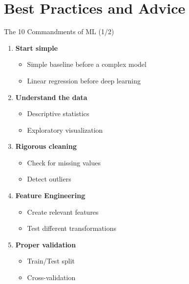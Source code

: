 \documentclass[12pt,aspectratio=169]{beamer}
\begin{document}
\section{Best Practices and Advice}

\begin{frame}{The 10 Commandments of ML (1/2)}
\begin{enumerate}
\item \textbf{Start simple}
\begin{itemize}
\item Simple baseline before a complex model
\item Linear regression before deep learning
\end{itemize}

\item \textbf{Understand the data}
\begin{itemize}
\item Descriptive statistics
\item Exploratory visualization
\end{itemize}

\item \textbf{Rigorous cleaning}
\begin{itemize}
\item Check for missing values
\item Detect outliers
\end{itemize}

\item \textbf{Feature Engineering}
\begin{itemize}
\item Create relevant features
\item Test different transformations
\end{itemize}

\item \textbf{Proper validation}
\begin{itemize}
\item Train/Test split
\item Cross-validation
\end{itemize}
\end{enumerate}
\end{frame}
\end{document}

